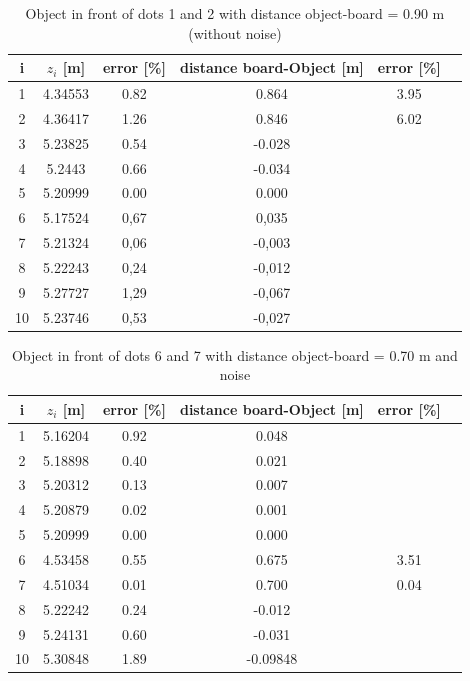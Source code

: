 \begin{table}[H]
\centering
\caption{Object in front of dots 1 and 2 with distance object-board = 0.90 m (without noise)}
\label{res90cm}
\renewcommand{\arraystretch}{1.5}
\begin{tabular}{|c|c|c|c|c|c|}
\hline
i & $z_i$ [m] & error [\%] & distance board-Object [m] & error [\%] \\
\hline
1 & 4.34553 & 0.82 & 0.864 & 3.95 \\
\hline
2 & 4.36417  & 1.26 & 0.846 & 6.02 \\
\hline
3 & 5.23825 & 0.54 & -0.028 & \\
\hline
4 & 5.2443 & 0.66 & -0.034 & \\
\hline
5 & 5.20999 &	0.00 & 0.000 & \\
\hline
6 & 5.17524 &	0,67 & 0,035 & \\
\hline
7 & 5.21324	& 0,06 & -0,003 & \\
\hline
8 & 5.22243	& 0,24 & -0,012 & \\
\hline
9 & 5.27727	& 1,29 & -0,067 & \\
\hline
10 & 5.23746 & 0,53 &	-0,027 & \\
\hline
\end{tabular}
\end{table}


\begin{table}[H]
\centering
\caption{Object in front of dots 6 and 7 with distance object-board = 0.70 m and noise}
\label{res70cm}
\renewcommand{\arraystretch}{1.5}
\begin{tabular}{|c|c|c|c|c|c|}
\hline
i & $z_i$ [m] & error [\%] & distance board-Object [m] & error [\%] \\
\hline
1 & 5.16204 & 0.92 & 0.048 & \\
\hline
2 & 5.18898 & 0.40 & 0.021 & \\
\hline
3 & 5.20312 & 0.13 & 0.007 & \\
\hline
4 & 5.20879 & 0.02 & 0.001 & \\
\hline
5 & 5.20999 & 0.00 & 0.000 & \\
\hline
6 & 4.53458 & 0.55 & 0.675 & 3.51 \\
\hline
7 & 4.51034 & 0.01 & 0.700 & 0.04 \\
\hline
8 & 5.22242 & 0.24 & -0.012 & \\
\hline
9 & 5.24131 & 0.60 & -0.031 & \\
\hline
10 & 5.30848 & 1.89 & -0.09848 & \\
\hline
\end{tabular}
\end{table}


